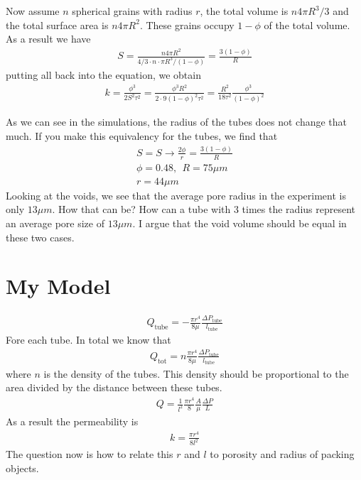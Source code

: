 Now assume $n$ spherical grains with radius $r$, the total volume is $n 4\pi R^3/3$ and the total surface area is $n 4 \pi R^2$. These grains occupy $1-\phi$ of the total volume. As a result we have
%
\begin{align}
    S = \frac{n 4\pi R^2}{4/3 \cdot n \cdot \pi R^3/(1-\phi) } = \frac{3(1-\phi)}{R}
\end{align}
%
putting all back into the equation, we obtain
%
\begin{align}
    k = \frac{\phi^3}{2S^2 \tau^2} = \frac{\phi^3 R ^2}{2\cdot 9 (1-\phi)^2\tau^2} = \frac{R^2}{18 \tau^2} \frac{\phi^3}{(1-\phi)^2}
\end{align}

As we can see in the simulations, the radius of the tubes does not change that much. If you make this equivalency for the tubes, we find that
%
\begin{align}
    S = S \to \frac{2\phi}{r} = \frac{3(1-\phi)}{R}\\
    \phi = 0.48,~~ R = 75\mu m \\
    r = 44\mu m
\end{align}
%
Looking at the voids, we see that the average pore radius in the experiment is only $13\mu m$. How that can be? How can a tube with 3 times the radius represent an average pore size of $13\mu m $. I argue that the void volume should be equal in these two cases.



\section{My Model}
%
\begin{align}
    Q_\text{tube} = - \frac{\pi r^4}{8\mu} \frac{\Delta P_\text{tube}}{l_\text{tube}}
\end{align}
%
Fore each tube. In total we know that
%
\begin{align}
    Q_\text{tot} = n \frac{\pi r^4}{8\mu} \frac{\Delta P_\text{tube}}{l_\text{tube}}
\end{align}
%
where $n$ is the density of the tubes. This density should be proportional to the area divided by the distance between these tubes. 
%
\begin{align}
    Q = \frac{1}{l^2} \frac{\pi r^4}{8} \frac{A}{\mu}\frac{\Delta P}{L}
\end{align}
%
As a result the permeability is 
%
\begin{align}
    k = \frac{\pi r^4}{8l^2}
\end{align}
%
The question now is how to relate this $r$ and $l$ to porosity and radius of packing objects. 

